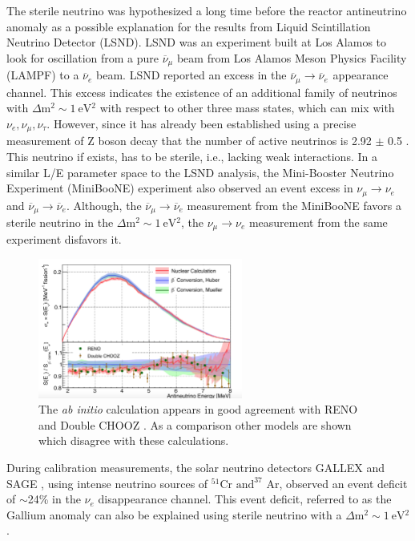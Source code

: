 \documentclass[11pt]{article}
\newcommand{\nuebar}{\ensuremath{\overline{\nu }_{e}} \hspace{1pt}}
\numberwithin{equation}{section}
\begin{document}
The sterile neutrino was hypothesized a long time before the reactor antineutrino anomaly as a possible explanation for the results from Liquid Scintillation Neutrino Detector (LSND). LSND \cite{aguilar2001evidence} was an experiment built at Los Alamos to look for oscillation from a pure $\overline{\nu}_{\mu}$ beam from Los Alamos Meson Physics Facility (LAMPF) to a \nuebar beam. LSND reported an excess in the $\overline{\nu}_{\mu} \rightarrow \nuebar$ appearance channel. This excess indicates the existence of an additional family of neutrinos with $ \Delta \text{m}^{2} \sim 1~ \text{eV}{^2}$ with respect to other three mass states, which can mix with $ \nu_{e}, \nu_{\mu}, \nu_{\tau} $. However, since it has already been established using a precise measurement of Z boson decay that the number of active neutrinos is 2.92 $\pm$ 0.5 \cite{particle2004particle}. This neutrino if exists, has to be sterile, i.e., lacking weak interactions. In a similar L/E parameter space to the LSND analysis, the Mini-Booster Neutrino Experiment (MiniBooNE) experiment \cite{aguilar2007search} also observed an event excess in $\nu_{\mu} \rightarrow \nu_{e}$ and $\overline{\nu}_{\mu} \rightarrow  \overline{\nu}_{e}$. Although, the $\overline{\nu}_{\mu} \rightarrow  \overline{\nu}_{e}$ measurement from the MiniBooNE favors a sterile neutrino in the $ \Delta \text{m}^{2} \sim 1~ \text{eV}{^2}$, the $\nu_{\mu} \rightarrow \nu_{e}$ measurement from the same experiment disfavors it.


\begin{figure}[h]
\centering
  \includegraphics[width=0.6\textwidth]{./DL.PNG}
\caption[Dwyer-Langford spectrum]{The \textit{ab initio} calculation appears in good agreement with RENO and Double CHOOZ \cite{DLSpectrum}. As a comparison other models are shown which disagree with these calculations.}
\label{fig:dl}
\end{figure}

During calibration measurements, the solar neutrino detectors GALLEX \cite{hampel1999gallex} and SAGE \cite{abdurashitov1994results}, using intense neutrino sources of $^{51} \text{Cr} \text{ and}^{37} \text{ Ar} $, observed an event deficit of $\sim$24\% in the $\nu_{e}$ disappearance channel. This event deficit, referred to as the Gallium anomaly can also be explained using sterile neutrino with a $ \Delta \text{m}^{2} \sim 1~ \text{eV}{^2} $. 
\end{document}

